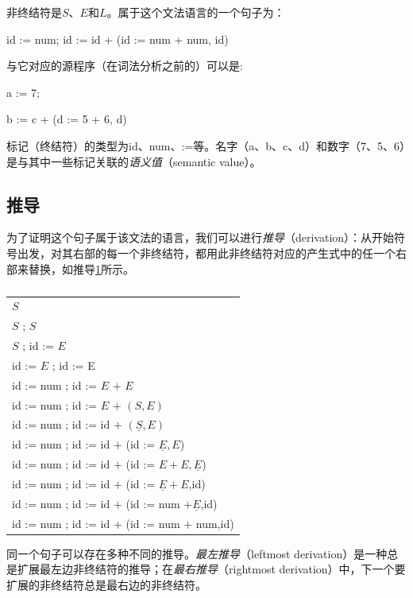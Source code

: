 \documentclass[cn,11pt,chinese]{elegantbook}
\begin{document}
非终结符是$S$、$E$和$L$。属于这个文法语言的一个句子为：

id := num; id := id + (id := num + num, id)

与它对应的源程序（在词法分析之前的）可以是:

a := 7;

b := c + (d := 5 + 6, d)

标记（终结符）的类型为id、num、:=等。名字（a、b、c、d）和数字（7、5、6）是与其中一些标记关联的\textit{语义值}（semantic value）。

\subsection{推导}

为了证明这个句子属于该文法的语言，我们可以进行\textit{推导}（derivation）：从开始符号出发，对其右部的每一个非终结符，都用此非终结符对应的产生式中的任一个右部来替换，如推导\ref{derivation:3-2}所示。

\renewcommand\tablename{推导}
\begin{table}[htbp]
\centering
\begin{tabular}{l}
  \toprule
  \underline{$S$} \\
  $S$ ; \underline{$S$} \\
  \underline{$S$} ; id := $E$ \\
  id := \underline{$E$} ; id := E \\
  id := num ; id := $E$ $+$ \underline{$E$} \\
  id := num ; id := \underline{$E$} $+$ $(S,E)$ \\
  id := num ; id := id $+$ $(\underline{S},E)$ \\
  id := num ; id := id $+$ (id := $\underline{E},E$) \\
  id := num ; id := id $+$ (id := $E + E,\underline{E}$) \\
  id := num ; id := id $+$ (id := $\underline{E} + E$,id) \\
  id := num ; id := id $+$ (id := num $+ \underline{E}$,id) \\
  id := num ; id := id $+$ (id := num $+$ num,id) \\
  \bottomrule
\end{tabular}
\caption{}\label{derivation:3-2}
\end{table}
\renewcommand\tablename{表}

同一个句子可以存在多种不同的推导。\textit{最左推导}（leftmost derivation）是一种总是扩展最左边非终结符的推导；在\textit{最右推导}（rightmost derivation）中，下一个要扩展的非终结符总是最右边的非终结符。
\end{document}
